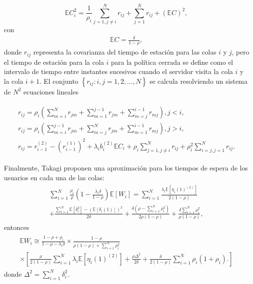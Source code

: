\documentclass{article}
\newcommand{\esp}{\mathbb{E}}
\numberwithin{equation}{section}
\begin{document}
\begin{equation}\label{Eq.Periodo.Intervisita.Gated}
\esp C_{i}^{2}=\frac{1}{\rho_{i}}\sum_{j=1,j\neq
i}^{N}r_{ij}+\sum_{j=1}^{N}r_{ij}+\left(\esp C\right)^{2},
\end{equation}
con
\begin{eqnarray*}
\esp C=\frac{\delta}{1-\rho},
\end{eqnarray*}
donde $r_{ij}$ representa la covarianza del tiempo de estaci\'on para las colas $i$ y $j$, pero el tiempo de estaci\'on para la cola $i$ para la pol\'itica cerrada se define como el intervalo de tiempo entre instantes sucesivos cuando el servidor visita la cola $i$ y la cola $i+1$. El conjunto $\left\{r_{ij}:i,j=1,2,\ldots,N\right\}$ se calcula resolviendo un
sistema de $N^{2}$ ecuaciones lineales

\begin{eqnarray}\label{Eq.Cov.TT.Gated}
\begin{array}{l}
r_{ij}=\rho_{i}\left(\sum_{m=i}^{N}r_{jm}+\sum_{m=1}^{j-1}r_{jm}+\sum_{m=j}^{i-1}r_{mj}\right),\textrm{
}j<i,\\
r_{ij}=\rho_{i}\left(\sum_{m=i}^{j-1}r_{jm}+\sum_{m=j}^{N}r_{jm}+\sum_{m=1}^{i-1}r_{mj}\right),\textrm{
}j>i,\\
r_{ij}=r_{i-1}^{(2)}-\left(r_{i-1}^{(1)}\right)^{2}+\lambda_{i}b_{i}^{(2)}\esp
C_{i}+\rho_{i}\sum_{j=1,j\neq
i}^{N}r_{ij}+\rho_{i}^{2}\sum_{i=j,j=1}^{N}r_{ij}.
\end{array}
\end{eqnarray}

Finalmente, Takagi \cite{TakagiI} proponen una aproximaci\'on para los tiempos de espera de los usuarios en cada una de las colas:
\begin{eqnarray}
\begin{array}{l}
\sum_{i=1}^{N}\frac{\rho_{i}}{\rho}\left(1-\frac{\lambda_{i}\delta}{1-\rho}\right)\esp\left[W_{i}\right]=\sum_{i=1}^{N}\frac{\lambda_{i}\esp\left[\eta_{i}\left(1\right)^{(2)}\right]}{2\left(1-\rho\right)}\\
+\frac{\sum_{i=1}^{N}\esp\left[\delta_{i}^{2}\right]-\left(\esp\left[\delta_{i}\left(1\right)\right]\right)^{2}}{2\delta}+\frac{\delta\left(\rho-\sum_{i=1}^{N}\rho_{i}^{2}\right)}{2\rho\left(1-\rho\right)}+\frac{\delta\sum_{i=1}^{N}\rho_{i}^{2}}{\rho\left(1-\rho\right)},
\end{array}
\end{eqnarray}
entonces
\begin{eqnarray}\label{LPCPKL}
\begin{array}{l}
\esp
W_{i}\cong\frac{1-\rho+\rho_{i}}{1-\rho-\lambda_{i}\delta}\times\frac{1-\rho}{\rho\left(1-\rho\right)+\sum_{i=1}^{N}\rho_{i}^{2}}\\
\times\left[\frac{\rho}{2\left(1-\rho\right)}\sum_{i=1}^{N}\lambda_{i}\esp\left[\eta_{i}\left(1\right)^{(2)}\right]+\frac{\rho\Delta^{2}}{2\delta}+\frac{\delta}{2\left(1-\rho\right)}\sum_{i=1}^{N}\rho_{i}\left(1+\rho_{i}\right).\right]
\end{array}
\end{eqnarray}
donde $\Delta^{2}=\sum_{i=1}^{N}\delta_{i}^{2}$. 
\end{document}
